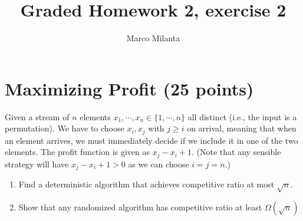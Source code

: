 \documentclass[11pt]{article}
\begin{document}
\author{Marco Milanta}
\title{Graded Homework 2, exercise 2}
\maketitle


\section*{Maximizing Profit (25 points)}
Given a stream of $n$ elements $x_1, \cdots, x_n \in \{1,\cdots,n\}$ all distinct (i.e., the input is a permutation). We have to choose $x_i, x_j$ with $j\geq i$ on arrival, meaning that when an element arrives, we must immediately decide if we include it in one of the two elements. The profit function is given as $x_j-x_i+1$. (Note that any sensible strategy will have $x_j-x_i+1 >0$ as we can choose $i=j=n$.)
\begin{enumerate}
    \item Find a deterministic algorithm that achieves competitive ratio at most $\sqrt{n}$.
    \item Show that any randomized algorithm has competitive ratio at least $\Omega(\sqrt{n})$
\end{enumerate}
\end{document}
